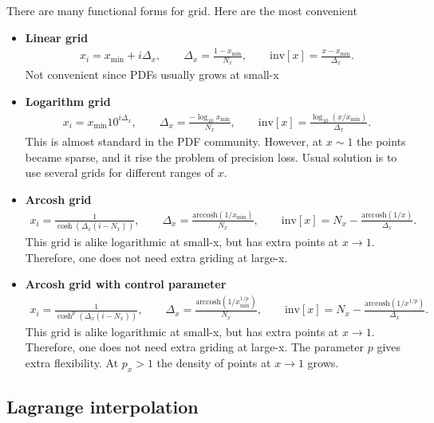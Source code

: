 \documentclass[prd,nofootinbib,eqsecnum,final]{revtex4}
\renewcommand{\(}{\left(}
\renewcommand{\)}{\right)}
\renewcommand{\[}{\left[}
\renewcommand{\]}{\right]}
\begin{document}
There are many functional forms for grid. Here are the most convenient
\begin{itemize}
\item \textbf{Linear grid} 
\begin{eqnarray}
x_i=x_{\text{min}}+i\Delta_x,\qquad \Delta_x=\frac{1-x_{\text{min}}}{N_x},\qquad \text{inv}[x]=\frac{x-x_{\text{min}}}{\Delta_x}.
\end{eqnarray}
Not convenient since PDFs usually grows at small-x
\item \textbf{Logarithm grid} 
\begin{eqnarray}
x_i=x_{\text{min}}10^{i\Delta_x},\qquad \Delta_x=\frac{-\log_{10} x_{\text{min}}}{N_x},\qquad \text{inv}[x]=\frac{\log_{10}(x/x_{\text{min}})}{\Delta_x}.
\end{eqnarray}
This is almost standard in the PDF community. However, at $x\sim 1$ the points became sparse, and it rise the problem of precision loss. Usual solution is to use several grids for different ranges of $x$.
\item \textbf{Arcosh grid} 
\begin{eqnarray}
x_i=\frac{1}{\cosh\(\Delta_x(i-N_x)\)},\qquad \Delta_x=\frac{\text{arccosh}(1/x_{\text{min}})}{N_x},\qquad \text{inv}[x]=
N_x-\frac{\text{arccosh}(1/x)}{\Delta_x}.
\end{eqnarray}
This grid is alike logarithmic at small-x, but has extra points at $x\to 1$. Therefore, one does not need extra griding at large-x.

\item \textbf{Arcosh grid with control parameter} 
\begin{eqnarray}
x_i=\frac{1}{\cosh^p\(\Delta_x(i-N_x)\)},\qquad \Delta_x=\frac{\text{arccosh}(1/x^{1/p}_{\text{min}})}{N_x},\qquad \text{inv}[x]=
N_x-\frac{\text{arccosh}(1/x^{1/p})}{\Delta_x}.
\end{eqnarray}
This grid is alike logarithmic at small-x, but has extra points at $x\to 1$. Therefore, one does not need extra griding at large-x. The parameter $p$ gives extra flexibility. At $p_x>1$ the density of points at $x\to 1$ grows.
\end{itemize}



\subsection{Lagrange interpolation}
\end{document}
